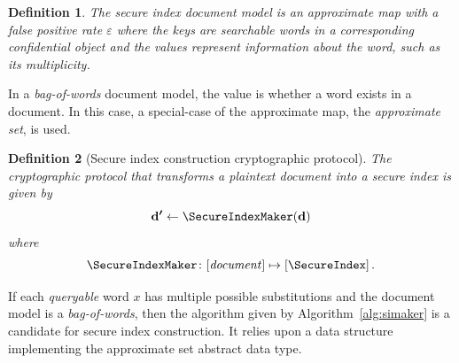 \documentclass[final,11pt]{article}
\renewcommand{\vec}[1]{\boldsymbol{\mathbf{#1}}}
\numberwithin{equation}{section}
\theoremstyle{plain}
\newtheorem{definition}{Definition}[section]
\theoremstyle{remark}
\begin{document}
\begin{definition}
The secure index document model is an \emph{approximate map}\cite{shmap,pmf} with a \emph{false positive rate} $\varepsilon$ where the keys are searchable words in a corresponding confidential object and the values represent information about the word, such as its \emph{multiplicity}.
\end{definition}
In a \emph{bag-of-words} document model, the value is whether a word exists in a document. In this case, a special-case of the approximate map, the \emph{approximate set}, is used.\cite{shs,phf}

\begin{definition}[Secure index construction cryptographic protocol]
\label{def:si_prot}
The cryptographic protocol that transforms a plaintext document into a secure index is given by
\begin{equation}
    \vec{d'} \gets \SecureIndexMaker\!\left(\vec{d}\right)
\end{equation}
where 
\begin{equation}
    \SecureIndexMaker \colon [\text{\emph{document}}] \mapsto [\SecureIndex]\,.
\end{equation}
\end{definition}
If each \emph{queryable} word $x$ has multiple possible substitutions and the document model is a \emph{bag-of-words}, then the algorithm given by Algorithm~\ref{alg:simaker} is a candidate for secure index construction. It relies upon a data structure implementing the approximate set abstract data type.\cite{shs,phf}
\end{document}
